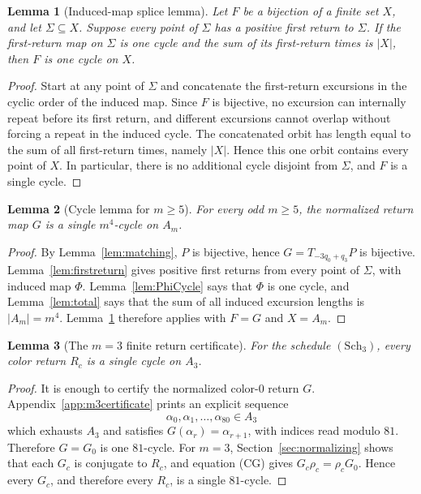 \documentclass[11pt]{article}
\newtheorem{lemma}{Lemma}
\theoremstyle{definition}
\begin{document}
\begin{lemma}[Induced-map splice lemma]\label{lem:splice}
Let \(F\) be a bijection of a finite set \(X\), and let \(\Sigma\subseteq X\).  Suppose every point of
\(\Sigma\) has a positive first return to \(\Sigma\).  If the first-return map on \(\Sigma\) is one cycle
and the sum of its first-return times is \(|X|\), then \(F\) is one cycle on \(X\).
\end{lemma}

\begin{proof}
Start at any point of \(\Sigma\) and concatenate the first-return excursions in the cyclic order of the
induced map.  Since \(F\) is bijective, no excursion can internally repeat before its first return, and
different excursions cannot overlap without forcing a repeat in the induced cycle.  The concatenated
orbit has length equal to the sum of all first-return times, namely \(|X|\).  Hence this one orbit
contains every point of \(X\).  In particular, there is no additional cycle disjoint from
\(\Sigma\), and \(F\) is a single cycle.
\end{proof}

\begin{lemma}[Cycle lemma for \(m\ge5\)]\label{lem:cycle}
For every odd \(m\ge5\), the normalized return map \(G\) is a single \(m^4\)-cycle on \(A_m\).
\end{lemma}

\begin{proof}
By Lemma~\ref{lem:matching}, \(P\) is bijective, hence \(G=T_{-3q_0+q_3}P\) is bijective.  Lemma~\ref{lem:firstreturn} gives positive first returns from every point of \(\Sigma\), with induced
map \(\Phi\).  Lemma~\ref{lem:PhiCycle} says that \(\Phi\) is one cycle, and Lemma~\ref{lem:total}
says that the sum of all induced excursion lengths is \(|A_m|=m^4\).  Lemma~\ref{lem:splice}
therefore applies with \(F=G\) and \(X=A_m\).
\end{proof}


\begin{lemma}[The \(m=3\) finite return certificate]\label{lem:m3certificate}
For the schedule \((\mathrm{Sch}_3)\), every color return \(R_c\) is a single cycle on \(A_3\).
\end{lemma}

\begin{proof}
It is enough to certify the normalized color-0 return \(G\).  Appendix~\ref{app:m3certificate} prints
an explicit sequence
\[
\alpha_0,\alpha_1,\ldots,\alpha_{80}\in A_3
\]
which exhausts \(A_3\) and satisfies \(G(\alpha_r)=\alpha_{r+1}\), with indices read modulo \(81\).
Therefore \(G=G_0\) is one \(81\)-cycle.  For \(m=3\), Section~\ref{sec:normalizing} shows that each
\(G_c\) is conjugate to \(R_c\), and equation \textup{(\(\mathrm{CG}\))} gives
\(G_c\rho_c=\rho_cG_0\).  Hence every \(G_c\), and therefore every \(R_c\), is a single \(81\)-cycle.
\end{proof}
\end{document}
